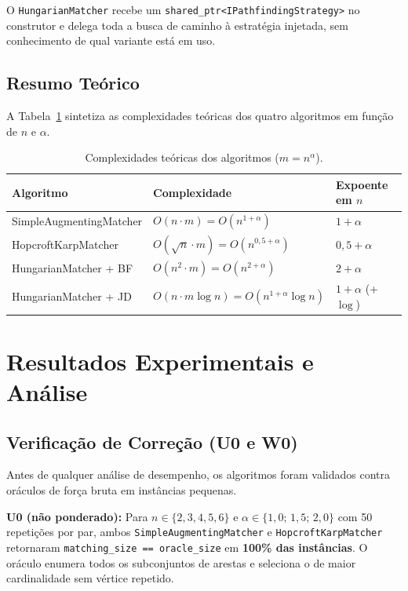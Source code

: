 \documentclass{infufrgs}
\begin{document}
O \texttt{HungarianMatcher} recebe um \texttt{shared\_ptr<IPathfindingStrategy>} no construtor e delega toda a busca de caminho à estratégia injetada, sem conhecimento de qual variante está em uso.

\subsection{Resumo Teórico}

A Tabela~\ref{tab:complexidades} sintetiza as complexidades teóricas dos quatro algoritmos em função de $n$ e $\alpha$.

\begin{table}[H]
\centering
\caption{Complexidades teóricas dos algoritmos ($m = n^\alpha$).}
\label{tab:complexidades}
\begin{tabular}{lll}
\toprule
\textbf{Algoritmo} & \textbf{Complexidade} & \textbf{Expoente em $n$} \\
\midrule
SimpleAugmentingMatcher    & $O(n \cdot m) = O(n^{1+\alpha})$               & $1 + \alpha$ \\
HopcroftKarpMatcher        & $O(\sqrt{n} \cdot m) = O(n^{0{,}5+\alpha})$   & $0{,}5 + \alpha$ \\
HungarianMatcher + BF      & $O(n^2 \cdot m) = O(n^{2+\alpha})$             & $2 + \alpha$ \\
HungarianMatcher + JD      & $O(n \cdot m \log n) = O(n^{1+\alpha} \log n)$ & $1 + \alpha$ (+$\log$) \\
\bottomrule
\end{tabular}
\end{table}

\section{Resultados Experimentais e Análise}

\subsection{Verificação de Correção (U0 e W0)}

Antes de qualquer análise de desempenho, os algoritmos foram validados contra oráculos de força bruta em instâncias pequenas.

\textbf{U0 (não ponderado):} Para $n \in \{2,3,4,5,6\}$ e $\alpha \in \{1{,}0;\,1{,}5;\,2{,}0\}$ com 50 repetições por par, ambos \texttt{SimpleAugmentingMatcher} e \texttt{HopcroftKarpMatcher} retornaram \texttt{matching\_size == oracle\_size} em \textbf{100\% das instâncias}. O oráculo enumera todos os subconjuntos de arestas e seleciona o de maior cardinalidade sem vértice repetido.
\end{document}
